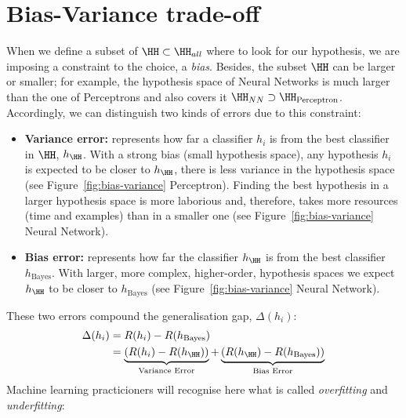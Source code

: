 \section{Bias-Variance trade-off}\label{sec:bias-variance}
When we define a subset of \(\HH \subset \HH_{all}\) where to look for our hypothesis, we are imposing a constraint to the choice, a \emph{bias}. Besides, the subset \(\HH\) can be larger or smaller; for example, the hypothesis space of Neural Networks is much larger than the one of Perceptrons and also covers it \(\HH_{NN} \supset \HH_{\text{Perceptron}}\).
Accordingly, we can distinguish two kinds of errors due to this constraint:
\begin{itemize}
	\item \textbf{Variance error:} represents how far a classifier \(h_i\) is from the best classifier in \(\HH\), \(h_\HH\). With a strong bias (small hypothesis space), any hypothesis \(h_i\) is expected to be closer to \(h_\HH\), there is less variance in the hypothesis space (see Figure~\ref{fig:bias-variance} Perceptron). Finding the best hypothesis in a larger hypothesis space is more laborious and, therefore, takes more resources (time and examples) than in a smaller one (see Figure~\ref{fig:bias-variance} Neural Network).
	\item \textbf{Bias error:} represents how far the classifier \(h_\HH\) is from the best classifier \(h_{\text{Bayes}}\). With larger, more complex, higher-order, hypothesis spaces we expect \(h_\HH\) to be closer to \(h_{\text{Bayes}}\) (see Figure~\ref{fig:bias-variance} Neural Network).
\end{itemize}
These two errors compound the generalisation gap, \(\Delta(h_i)\):
\begin{align}
	\Delta(h_i) &= R(h_i)-R(h_{\text{Bayes}}) \\
	&= \underbrace{(R(h_i)-R(h_\HH))}_{\text{Variance Error}}+ \underbrace{(R(h_\HH)-R(h_{\text{Bayes}}) )}_{\text{Bias Error}}
\end{align}
Machine learning practicioners will recognise here what is called \emph{overfitting} and \emph{underfitting}:

